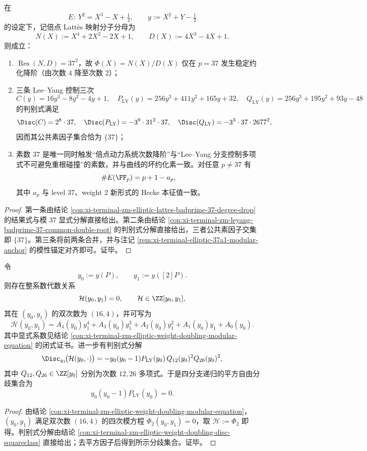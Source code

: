 \begin{theorem}\label{thm:xi-terminal-zm-leyang-elliptic-unique-common-prime}
在
\[
E:\ Y^2=X^3-X+\tfrac14,\qquad y:=X^2+Y-\tfrac12
\]
的设定下，记倍点 Latt\`es 映射分子分母为
\[
N(X):=X^4+2X^2-2X+1,\qquad D(X):=4X^3-4X+1.
\]
则成立：
\begin{enumerate}
  \item \(\operatorname{Res}(N,D)=37^2\)，故 \(\Phi(X)=N(X)/D(X)\) 仅在 \(p=37\) 发生稳定约化降阶（由次数 \(4\) 降至次数 \(2\)）；
  \item 三条 Lee--Yang 控制三次
  \[
  C(y)=16y^3-8y^2-4y+1,\quad
  P_{\mathrm{LY}}(y)=256y^3+411y^2+165y+32,\quad
  Q_{\mathrm{LY}}(y)=256y^3+195y^2+93y-48
  \]
  的判别式满足
  \[
  \Disc(C)=2^8\cdot 37,\quad
  \Disc(P_{\mathrm{LY}})=-3^9\cdot 31^2\cdot 37,\quad
  \Disc(Q_{\mathrm{LY}})=-3^3\cdot 37\cdot 2677^2,
  \]
  因而其公共素因子集合恰为 \(\{37\}\)；
  \item 素数 \(37\) 是唯一同时触发“倍点动力系统次数降阶”与“Lee--Yang 分支控制多项式不可避免重根碰撞”的素数，并与曲线的坏约化素一致。对任意 \(p\neq 37\) 有
  \[
  \#E(\FF_p)=p+1-a_p,
  \]
  其中 \(a_p\) 与 level \(37\)、weight \(2\) 新形式的 Hecke 本征值一致。
\end{enumerate}
\end{theorem}
\begin{proof}
第一条由结论 \ref{con:xi-terminal-zm-elliptic-lattes-badprime-37-degree-drop} 的结果式与模 \(37\) 显式分解直接给出。第二条由结论 \ref{con:xi-terminal-zm-leyang-badprime-37-common-double-root} 的判别式分解直接给出，三者公共素因子交集即 \(\{37\}\)。第三条将前两条合并，并与注记 \ref{rem:xi-terminal-elliptic-37a1-modular-anchor} 的模性锚定对齐即可。证毕。
\end{proof}

\begin{theorem}\label{thm:xi-terminal-zm-leyang-elliptic-four-branch-recursion}
令
\[
y_0:=y(P),\qquad y_1:=y([2]P).
\]
则存在整系数代数关系
\[
\mathcal H(y_0,y_1)=0,\qquad \mathcal H\in\ZZ[y_0,y_1],
\]
其在 \((y_0,y_1)\) 的双次数为 \((16,4)\)，并可写为
\[
\mathcal H(y_0,y_1)=A_4(y_0)y_1^4+A_3(y_0)y_1^3+A_2(y_0)y_1^2+A_1(y_0)y_1+A_0(y_0).
\]
其中显式系数见结论 \ref{con:xi-terminal-zm-elliptic-weight-doubling-modular-equation} 的闭式证书。进一步有判别式分解
\[
\Disc_{y_1}\!\bigl(\mathcal H(y_0,\cdot)\bigr)
=-y_0(y_0-1)P_{\mathrm{LY}}(y_0)\,Q_{12}(y_0)^2Q_{26}(y_0)^2,
\]
其中 \(Q_{12},Q_{26}\in\ZZ[y_0]\) 分别为次数 \(12,26\) 多项式。于是四分支递归的平方自由分歧集合为
\[
y_0(y_0-1)P_{\mathrm{LY}}(y_0)=0.
\]
\end{theorem}
\begin{proof}
由结论 \ref{con:xi-terminal-zm-elliptic-weight-doubling-modular-equation}，\((y_0,y_1)\) 满足双次数 \((16,4)\) 的四次模方程 \(\Phi_2(y_0,y_1)=0\)，取 \(\mathcal H:=\Phi_2\) 即得。判别式分解由结论 \ref{con:xi-terminal-zm-elliptic-weight-doubling-disc-squareclass} 直接给出；去平方因子后得到所示分歧集合。证毕。
\end{proof}

